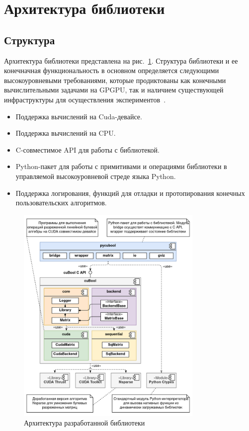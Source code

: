\section{Архитектура библиотеки}

\subsection{Структура}

Архитектура библиотеки представлена на рис.~\ref{fig:cubool_architecture}.
Структура библиотеки и ее конечначная функциональность в основном определяется следующими высокоуровневыми требованиями, которые продиктованы как конечными вычислительными задачами на GPGPU, так и наличием существующей инфраструктуры для осуществления экспериментов~\cite{net:cfpq_py_algo}.

\begin{itemize}
    \item Поддержка вычислений на Cuda-девайсе.
    \item Поддержка вычислений на CPU.
    \item C-совместимое API для работы с библиотекой.
    \item Python-пакет для работы с примитивами и операциями библиотеки в управляемой высокоуровневой стреде языка Python.
    \item Поддержка логирования, функций для отладки и протопирования конечных пользовательских алгоритмов.
\end{itemize}

\begin{figure}[h]
    \centering
    \includegraphics[width=0.8\textwidth]{images/library_architecture.png}
    \caption{Архитектура разработанной библиотеки}
    \label{fig:cubool_architecture}
\end{figure}

